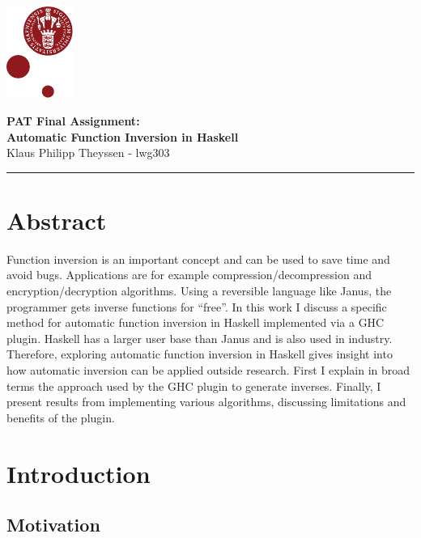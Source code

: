 \documentclass[12pt,a4paper, dvipsnames,usenames]{article}
\begin{document}
\begin{minipage}[b]{1.0\linewidth}
\includegraphics[height=30mm]{KULogo.pdf}
\vspace*{-16ex}
\begin{center}
  {\large \bf PAT Final Assignment: \\ Automatic Function Inversion in Haskell}
  \vspace*{2ex} \\
\vspace*{1ex}
Klaus Philipp Theyssen - lwg303
\end{center}
\vspace {1ex}
\vspace*{-8pt}
{\color{KU-red}\hrule}
\end{minipage}

\section*{Abstract}

Function inversion is an important concept and can be used to save time
and avoid bugs. Applications are for example compression/decompression and
encryption/decryption algorithms. Using a reversible language like
Janus, the programmer gets inverse functions for ``free''.
In this work I discuss a specific method for automatic function inversion in Haskell
implemented via a GHC plugin. Haskell has a larger user base
than Janus and is also used in industry. Therefore, exploring automatic
function inversion in Haskell gives insight into how
automatic inversion can be applied outside research.
First I explain in broad terms the approach used by the GHC plugin
to generate inverses. Finally, I present results from
implementing various algorithms, discussing limitations and benefits of the plugin.



\section{Introduction}

\subsection{Motivation}
\end{document}
